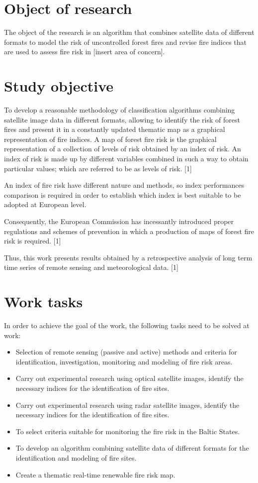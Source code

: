 \section{Object of research}
	The object of the research is an algorithm that combines satellite data of different formats to model the risk of uncontrolled forest fires and revise fire indices that are used to assess fire risk in [insert area of concern].

\section{Study objective}
	To develop a reasonable methodology of classification algorithms combining satellite image data in different formats, allowing to identify the risk of forest fires and present it in a constantly updated thematic map as a graphical representation of fire indices. A map of forest fire risk is the graphical representation of a collection of levels of risk obtained by an
	index of risk. An index of risk is made up by different variables combined in such a way to obtain particular values; which are referred to be as levels of risk. [1] 
	
	An index of fire risk have different nature and methods, so index performances comparison is required in order to establish which index is best suitable to be adopted at European level.
	
	Consequently, the European Commission has incessantly introduced proper regulations and schemes of prevention in which a production of maps of forest fire risk is required. [1]
	
	Thus, this work presents results obtained by a
	retrospective analysis of long term time series of remote sensing and meteorological data. [1]

\section{Work tasks}
	In order to achieve the goal of the work, the following tasks need to be solved at work:
\begin{itemize}
	\item Selection of remote sensing (passive and active) methods and criteria for identification, investigation, monitoring and modeling of fire risk areas.
	\item Carry out experimental research using optical satellite images, identify the necessary indices for the identification of fire sites.
	\item Carry out experimental research using radar satellite images, identify the necessary indices for the identification of fire sites.
	\item To select criteria suitable for monitoring the fire risk in the Baltic States.
	\item To develop an algorithm combining satellite data of different formats for the identification and modeling of fire sites.
	\item Create a thematic real-time renewable fire risk map.
\end{itemize}

